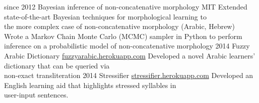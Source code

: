 \documentclass[]{friggeri-cv}
\begin{document}
\begin{entrylist}
  \entry
    {since 2012}
    {Bayesian inference of non-concatenative morphology}
    {MIT}
    {\Squaredot Extended state-of-the-art Bayesian techniques for morphological learning to \\
    \hspace*{3pt} the more complex case of non-concatenative morphology (Arabic, Hebrew) \\
    \Squaredot Wrote a Markov Chain Monte Carlo (MCMC) sampler in Python to perform \\
    \hspace*{3pt} inference on a probabilistic model of non-concatenative morphology}
  \entry
    {2014}
    {Fuzzy Arabic Dictionary}
    {\href{http://fuzzyarabic.herokuapp.com}{fuzzyarabic.herokuapp.com}}
    {
    \Squaredot Developed a novel Arabic learners' dictionary that can be queried via \\
    \hspace*{3pt} non-exact transliteration}
  \entry
    {2014}
    {Stressifier}
    {\href{http://stressifier.herokuapp.com}{stressifier.herokuapp.com}}
    {
    \Squaredot Developed an English learning aid that highlights stressed syllables in \\
    \hspace*{3pt} user-input sentences.}
\end{entrylist}
\end{document}
